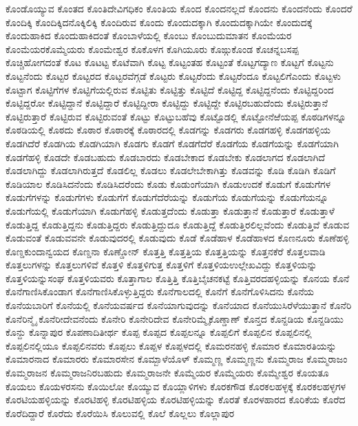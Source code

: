 {ಕೊಂಡೊಯ್ಯುವ
ಕೊಂತದ
ಕೊಂತಿದೇವಿಗಧಿಕಂ
ಕೊಂತಿಯ
ಕೊಂದ
ಕೊಂದನಲ್ಲದೆ
ಕೊಂದನು
ಕೊಂದನೆಂದು
ಕೊಂದರೆ
ಕೊಂದಿಕ್ಕಿ
ಕೊಂದಿಕ್ಕಿದನೊಕ್ಕಿಲಿಕ್ಕಿ
ಕೊಂದಿರುವ
ಕೊಂದು
ಕೊಂದುದಕ್ಕಾಗಿ
ಕೊಂದುದಕ್ಕಾಗಿಯೇ
ಕೊಂದುದಕ್ಕೆ
ಕೊಂದುಹಾಕಿದ
ಕೊಂದುಹಾಕಿದಂತೆ
ಕೊಂಬಾಳೆಯಲ್ಲಿ
ಕೊಂಬು
ಕೊಂಬುದುಮಾತನ
ಕೊಂಮೆಯರ
ಕೊಂಮೆಯರಕೊಮ್ಮೆಯರು
ಕೊಂಮೇಶ್ವರ
ಕೊಕೊಳಗ
ಕೊಗಿಯೂರು
ಕೊಙ್ಗುಕೊಂಡ
ಕೊಚನ್ನಬಸಪ್ಪ
ಕೊಚ್ಚಿಹೋಗದಂತೆ
ಕೊಟ
ಕೊಟಟ್ಟ
ಕೊಟೆವಾಗಿ
ಕೊಟ್ಟ
ಕೊಟ್ಟಂತಹ
ಕೊಟ್ಟಂತೆ
ಕೊಟ್ಟಗದ್ಯಾಣ
ಕೊಟ್ಟಗೆ
ಕೊಟ್ಟನು
ಕೊಟ್ಟನೆಂದು
ಕೊಟ್ಟರ
ಕೊಟ್ಟರದ
ಕೊಟ್ಟರವೆಗ್ಗಡೆ
ಕೊಟ್ಟರು
ಕೊಟ್ಟರೆಂದು
ಕೊಟ್ಟರೆಂದೂ
ಕೊಟ್ಟಲಿಗೆಎಂದು
ಕೊಟ್ಟಳು
ಕೊಟ್ಟಾಗ
ಕೊಟ್ಟಿಗೆಗಳ
ಕೊಟ್ಟಿಗೆಯಲ್ಲಿರುವ
ಕೊಟ್ಟಿತು
ಕೊಟ್ಟಿತ್ತು
ಕೊಟ್ಟಿದೆ
ಕೊಟ್ಟಿದ್ದ
ಕೊಟ್ಟಿದ್ದನೆಂದು
ಕೊಟ್ಟಿದ್ದರಿಂದ
ಕೊಟ್ಟಿದ್ದರೋ
ಕೊಟ್ಟಿದ್ದಾನೆ
ಕೊಟ್ಟಿದ್ದಾರೆ
ಕೊಟ್ಟಿದ್ದೀರಾ
ಕೊಟ್ಟಿದ್ದು
ಕೊಟ್ಟಿದ್ದೇ
ಕೊಟ್ಟಿರಬಹುದೆಂದು
ಕೊಟ್ಟಿರುತ್ತಾನೆ
ಕೊಟ್ಟಿರುತ್ತಾರೆ
ಕೊಟ್ಟಿರುವ
ಕೊಟ್ಟಿರುವಂತೆ
ಕೊಟ್ಟು
ಕೊಟ್ಟುಬಹೆವು
ಕೊಟ್ಟೊಡಲ್ಲಿ
ಕೊಟ್ಟೋನೆಱೆಯಪ್ಪ
ಕೊಠಡಿಗಳನ್ನೂ
ಕೊಠಡಿಯಲ್ಲಿ
ಕೊಠದು
ಕೊಠಾರ
ಕೊಠಾರಕ್ಕೆ
ಕೊಠಾರದಲ್ಲಿ
ಕೊಡಗನ್ನು
ಕೊಡಗರು
ಕೊಡಗಹಳ್ಳಿ
ಕೊಡಗಹಳ್ಳಿಯ
ಕೊಡಗಿದೆರೆ
ಕೊಡಗಿಯ
ಕೊಡಗಿಯಾಗಿ
ಕೊಡಗು
ಕೊಡಗೆ
ಕೊಡಗೆದೆರೆ
ಕೊಡಗೆಯ
ಕೊಡಗೆಯನ್ನು
ಕೊಡಗೆಯಾಗಿ
ಕೊಡಗೆಹಳ್ಳಿ
ಕೊಡದೇ
ಕೊಡಬಹುದು
ಕೊಡಬಾರದು
ಕೊಡಬೇಕಾದ
ಕೊಡಬೇಕು
ಕೊಡಲಾಗದ
ಕೊಡಲಾಗಿದೆ
ಕೊಡಲಾಗಿದ್ದು
ಕೊಡಲಾಗಿರುತ್ತದೆ
ಕೊಡಲಿಲ್ಲ
ಕೊಡಲು
ಕೊಡಲೇಬೇಕಾಗಿತ್ತು
ಕೊಡವನ್ನು
ಕೊಡಿ
ಕೊಡಿಗಿ
ಕೊಡಿಗೆ
ಕೊಡಿಯಾಲ
ಕೊಡಿಸಿದನೆಂದು
ಕೊಡಿಸಿದರೆಂದು
ಕೊಡು
ಕೊಡುಂಗೆಯಾಗಿ
ಕೊಡುಉದಕೆ
ಕೊಡುಗೆ
ಕೊಡುಗೆಗಳ
ಕೊಡುಗೆಗಳನ್ನು
ಕೊಡುಗೆಗಳು
ಕೊಡುಗೆಗೆ
ಕೊಡುಗೆದೆರೆಯನ್ನು
ಕೊಡುಗೆಯ
ಕೊಡುಗೆಯನ್ನು
ಕೊಡುಗೆಯನ್ನೂ
ಕೊಡುಗೆಯಲ್ಲಿ
ಕೊಡುಗೆಯಾಗಿ
ಕೊಡುಗೆಹಳ್ಳಿ
ಕೊಡುತ್ತದೆಂದು
ಕೊಡುತ್ತಾ
ಕೊಡುತ್ತಾನೆ
ಕೊಡುತ್ತಾರೆ
ಕೊಡುತ್ತಾಳೆ
ಕೊಡುತ್ತಿದ್ದ
ಕೊಡುತ್ತಿದ್ದನು
ಕೊಡುತ್ತಿದ್ದರು
ಕೊಡುತ್ತಿದ್ದುದೂ
ಕೊಡುತ್ತಿದ್ದೆ
ಕೊಡುತ್ತಿರಲಿಲ್ಲವೆಂದು
ಕೊಡುತ್ತಿವೆ
ಕೊಡುವ
ಕೊಡುವಂತೆ
ಕೊಡುವವನೇ
ಕೊಡುವುದರಲ್ಲಿ
ಕೊಡುವುದು
ಕೊಡೆ
ಕೊಡೆಹಾಳ
ಕೊಡೆಹಾಳದ
ಕೊಣನೂರು
ಕೊಣೆಹಳ್ಳಿ
ಕೊಣ್ಡಕುಂದಾನ್ವಯದ
ಕೊಣ್ಡನಾ
ಕೊಣ್ಡೋನ್
ಕೊತ್ತತ್ತಿ
ಕೊತ್ತತ್ತಿಯ
ಕೊತ್ತತ್ತಿಯನ್ನು
ಕೊತ್ತನಕೆರೆ
ಕೊತ್ತಲವಾಡಿ
ಕೊತ್ತಲುಗಳನ್ನು
ಕೊತ್ತಲುಗಳಿವೆ
ಕೊತ್ತಳಿ
ಕೊತ್ತಳಿಗುತ್ತ
ಕೊತ್ತಳಿಗೆ
ಕೊತ್ತಳಿಯಉಲ್ಲೇಖವಿದ್ದು
ಕೊತ್ತಳಿಯನ್ನು
ಕೊತ್ತಳಿಯನ್ನುಸಂಘ
ಕೊತ್ತಳಿಯವರು
ಕೊತ್ತಾಗಾಲ
ಕೊತ್ತಿತ್ತಿ
ಕೊತ್ತಿಬೈಚನಕಟ್ಟೆ
ಕೊತ್ತಿವರದಹಳ್ಳಿಯನ್ನು
ಕೊನಯ
ಕೊನೆ
ಕೊನೆಗಾಣಿಸಿಕೊಂಡಾಗ
ಕೊನೆಗಾಣಿಸಿಕೊಳ್ಳುತ್ತಿದ್ದರು
ಕೊನೆಗಾಲದಲ್ಲಿ
ಕೊನೆಗೆ
ಕೊನೆಗೊಳಿಸಿದನು
ಕೊನೆಯ
ಕೊನೆಯಬಾರಿಗೆ
ಕೊನೆಯಲ್ಲಿ
ಕೊನೆಯವರ್ಷದ
ಕೊನೆಯಾಗುವುದನ್ನು
ಕೊನೆಯಾದ
ಕೊನೆಯುಸಿರೆಳೆಯುತ್ತಾನೆ
ಕೊನೆರಿ
ಕೊನೆರಿನ್ಮೈ
ಕೊನೆರೀದೇವನೆಂದು
ಕೊನೇರಿ
ಕೊನೇರಿದೇವ
ಕೊನೇರಿಮ್ಮೈಕೊಣ್ಡಾಣ್
ಕೊನ್ತದ
ಕೊನ್ದಡಿಯ
ಕೊನ್ದಡಿಯು
ಕೊನ್ದು
ಕೊನ್ನಾಪುರ
ಕೊಪಣಾದಿತೀರ್ಥ
ಕೊಪ್ಪ
ಕೊಪ್ಪದ
ಕೊಪ್ಪಲನ್ನೂ
ಕೊಪ್ಪಲಿಗೆ
ಕೊಪ್ಪಲಿನ
ಕೊಪ್ಪಲಿನಲ್ಲಿ
ಕೊಪ್ಪಲಿನಲ್ಲಿಯೂ
ಕೊಪ್ಪಲಿನವರು
ಕೊಪ್ಪಲು
ಕೊಪ್ಪಳ
ಕೊಪ್ಪಳದಲ್ಲಿ
ಕೊಮರನಹಳ್ಳಿ
ಕೊಮಾರ
ಕೊಮಾರತಿಯನ್ನು
ಕೊಮಾರನಾದ
ಕೊಮಾರರು
ಕೊಮಾರಸೇನ
ಕೊಮ್ಬಾಳೆಯೊಳ್
ಕೊಮ್ಮಣ್ಣ
ಕೊಮ್ಮಣ್ಣನು
ಕೊಮ್ಮರಾಜ
ಕೊಮ್ಮರಾಜಂ
ಕೊಮ್ಮರಾಜನ
ಕೊಮ್ಮರಾಜನಿರಬಹುದು
ಕೊಮ್ಮರಾಜನೇ
ಕೊಮ್ಮೆಯರ
ಕೊಮ್ಮೆಯರು
ಕೊಮ್ಮೇಶ್ವರ
ಕೊಯತೂ
ಕೊಯಲು
ಕೊಯಳರಸನು
ಕೊಯಿಲೋ
ಕೊಯ್ಯುವ
ಕೊಯ್ಲಾಳಿಗಳು
ಕೊರಕಗೌಡ
ಕೊರಕಲಹಳ್ಳಕ್ಕೆ
ಕೊರಕಲಹಳ್ಳಗಳ
ಕೊರಟಿಯಹಳ್ಳಿಯನ್ನು
ಕೊರಟಿಹಳ್ಳಿ
ಕೊರಟಿಹಳ್ಳಿಯ
ಕೊರಟಿಹಳ್ಳಿಯನ್ನು
ಕೊರತೆ
ಕೊರಳಹಾರದ
ಕೊರಿಕೆಯ
ಕೊರೆದ
ಕೊರೆದಿದ್ದಾರೆ
ಕೊರೆದು
ಕೊರೆಯಿಸಿ
ಕೊಲುವಲ್ಲಿ
ಕೊಲೆ
ಕೊಲ್ಲಲು
ಕೊಲ್ಲಾಪುರ
}

